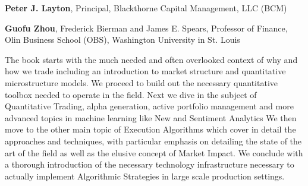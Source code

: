 \pagestyle{empty}

 \medskip

 \par
{%
\begin{flushright}
\begin{minipage}{0.6\textwidth}
\textbf{Peter J. Layton}, Principal, Blackthorne Capital Management, LLC (BCM)
\end{minipage}
\end{flushright} 
\twomedskip
}


 \par
{%
\begin{flushright}
\begin{minipage}{0.6\textwidth}
\textbf{Guofu Zhou}, Frederick Bierman and James E. Spears, Professor of Finance, Olin Business School (OBS), Washington University in St. Louis 
\end{minipage}
\end{flushright}
} \medskip

The book starts with the much needed and often overlooked context of why and how we trade including an introduction to market structure and quantitative microstructure models.
We proceed to build out the necessary quantitative toolbox needed to operate in the field.
Next we dive in the subject of Quantitative Trading, alpha generation, active portfolio management and more advanced topics in machine learning like New and Sentiment Analytics
We then move to the other main topic of Execution Algorithms which cover in detail the approaches and techniques, with particular emphasis on detailing the state of the art of the field as well as the elusive concept of Market Impact. We conclude with a thorough introduction of the necessary technology infrastructure necessary to actually implement Algorithmic Strategies in large scale production settings. \twomedskip


